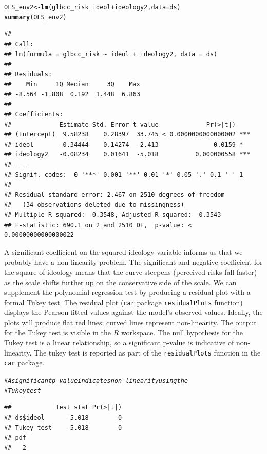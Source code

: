 \documentclass[11pt,openany]{book}\usepackage[]{graphicx}\usepackage[]{color}
\makeatletter
\newcommand{\hlcom}[1]{\textcolor[rgb]{0.678,0.584,0.686}{\textit{#1}}}%
\newcommand{\hlopt}[1]{\textcolor[rgb]{0,0,0}{#1}}%
\newcommand{\hlstd}[1]{\textcolor[rgb]{0.345,0.345,0.345}{#1}}%
\newcommand{\hlkwb}[1]{\textcolor[rgb]{0.69,0.353,0.396}{#1}}%
\newcommand{\hlkwc}[1]{\textcolor[rgb]{0.333,0.667,0.333}{#1}}%
\newcommand{\hlkwd}[1]{\textcolor[rgb]{0.737,0.353,0.396}{\textbf{#1}}}%
\newenvironment{kframe}{%
 \def\at@end@of@kframe{}%
 \ifinner\ifhmode%
  \def\at@end@of@kframe{\end{minipage}}%
  \begin{minipage}{\columnwidth}%
 \fi\fi%
 \def\FrameCommand##1{\hskip\@totalleftmargin \hskip-\fboxsep
 \colorbox{shadecolor}{##1}\hskip-\fboxsep
     \hskip-\linewidth \hskip-\@totalleftmargin \hskip\columnwidth}%
 \MakeFramed {\advance\hsize-\width
   \@totalleftmargin\z@ \linewidth\hsize
   \@setminipage}}%
 {\par\unskip\endMakeFramed%
 \at@end@of@kframe}
\newenvironment{knitrout}{}{} %
\renewenvironment{knitrout}{\begin{singlespace}}{\end{singlespace}} %
\makeatother
\begin{document}
\begin{knitrout}
\color{fgcolor}\begin{kframe}
\begin{alltt}
\hlstd{OLS_env2} \hlkwb{<-} \hlkwd{lm}\hlstd{(glbcc_risk} \hlopt{~} \hlstd{ideol} \hlopt{+} \hlstd{ideology2,} \hlkwc{data} \hlstd{= ds)}
\hlkwd{summary}\hlstd{(OLS_env2)}
\end{alltt}
\begin{verbatim}
## 
## Call:
## lm(formula = glbcc_risk ~ ideol + ideology2, data = ds)
## 
## Residuals:
##    Min     1Q Median     3Q    Max 
## -8.564 -1.808  0.192  1.448  6.863 
## 
## Coefficients:
##             Estimate Std. Error t value             Pr(>|t|)    
## (Intercept)  9.58238    0.28397  33.745 < 0.0000000000000002 ***
## ideol       -0.34444    0.14274  -2.413               0.0159 *  
## ideology2   -0.08234    0.01641  -5.018          0.000000558 ***
## ---
## Signif. codes:  0 '***' 0.001 '**' 0.01 '*' 0.05 '.' 0.1 ' ' 1
## 
## Residual standard error: 2.467 on 2510 degrees of freedom
##   (34 observations deleted due to missingness)
## Multiple R-squared:  0.3548,	Adjusted R-squared:  0.3543 
## F-statistic: 690.1 on 2 and 2510 DF,  p-value: < 0.00000000000000022
\end{verbatim}
\end{kframe}
\end{knitrout}
A significant coefficient on the squared ideology variable informs us that we probably have a non-linearity problem. The significant and negative coefficient for the square of ideology means that the curve steepens (perceived risks fall faster) as the scale shifts further up on the conservative side of the scale. We can supplement the polynomial regression test by producing a residual plot with a formal Tukey test. The residual plot (\texttt{car} package \texttt{residualPlots} function) displays the Pearson fitted values against the model's observed values. Ideally, the plots will produce flat red lines; curved lines represent non-linearity.  The output for the Tukey test is visible in the $R$ workspace.  The null hypothesis for the Tukey test is a linear relationship, so a significant p-value is indicative of non-linearity.  The tukey test is reported as part of the \texttt{residualPlots} function in the \texttt{car} package.

\begin{knitrout}
\color{fgcolor}\begin{kframe}
\begin{alltt}
\hlcom{# A significant p-value indicates non-linearity using the}
\hlcom{# Tukey test}
\end{alltt}
\begin{verbatim}
##            Test stat Pr(>|t|)
## ds$ideol      -5.018        0
## Tukey test    -5.018        0
## pdf 
##   2
\end{verbatim}
\end{kframe}
\end{knitrout}
\end{document}
